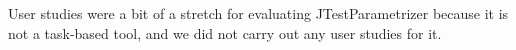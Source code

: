 User studies were a bit of a stretch for evaluating JTestParametrizer because it is not a task-based tool, and we did not carry out any user studies for it.






